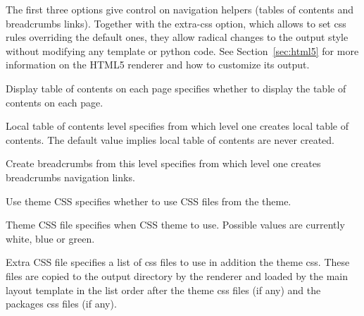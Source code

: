 The first three options give control on navigation helpers (tables of
contents and breadcrumbs links). Together with the extra-css option,
which allows to set css rules overriding the default ones, they allow
radical changes to the output style without modifying any template or
python code. See Section~\ref{sec:html5} for more information on the
HTML5 renderer and how to customize its output.

\begin{configuration}{Display table of contents on each page}
specifies whether to display the table of contents on each page.
\end{configuration}


\begin{configuration}{Local table of contents level}
specifies from which level one creates local table of contents. The
default value implies local table of contents are never created.
\end{configuration}


\begin{configuration}{Create breadcrumbs from this level}
specifies from which level one creates breadcrumbs navigation links.
\end{configuration}

\begin{configuration}{Use theme CSS}
specifies whether to use CSS files from the theme.
\end{configuration}

\begin{configuration}{Theme CSS file}
specifies when CSS theme to use. Possible values are currently white, blue or
green.
\end{configuration}

\begin{configuration}{Extra CSS file}
specifies a list of css files to use in addition the
theme css. These files are copied to the output directory by the
renderer and loaded by the main layout template in the list order after
the theme css files (if any) and the packages css files (if any).
\end{configuration}

